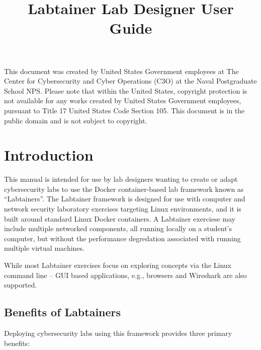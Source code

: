 \documentclass[12pt]{article}
\begin{document}
\begin{titlepage}
\title {Labtainer Lab Designer User Guide}
\maketitle

\vspace{2.0in}
This document was created by United States Government employees at 
The Center for Cybersecurity and Cyber Operations (C3O) at the Naval Postgraduate School NPS. 
Please note that within the United States, copyright protection is not available for any works created  
by United States Government employees, pursuant to Title 17 United States Code Section 105.   
This document is in the public domain and is not subject to copyright. 
\end{titlepage}
\tableofcontents
\newpage
\section {Introduction}
This manual is intended for use by lab designers wanting
to create or adapt cybersecurity labs to use the Docker
container-based lab framework known as ``Labtainers''.
The Labtainer framework is designed for use with computer and network security
laboratory exercises targeting Linux environments, and it is built around 
standard Linux Docker containers.  A Labtainer exerciese may include multiple 
networked components, all running locally on a student's computer, but without
the performance degredation associated with running multiple virtual machines.

While most Labtainer exercises focus on exploring concepts via the Linux command line -- GUI based
applications, e.g., browsers and Wireshark are also supported. 

\subsection {Benefits of Labtainers}

Deploying cybersecurity labs using this framework
provides three primary benefits:
\end{document}
